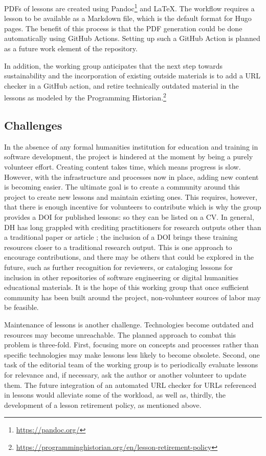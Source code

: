 \documentclass[final]{anthology-ch} %
\begin{document}
PDFs of lessons are created using Pandoc\footnote{\url{https://pandoc.org/}
} and LaTeX. The workflow requires a lesson to be available as a Markdown file, which is the default format for Hugo pages. The benefit of this process is that the PDF generation could be done automatically using GitHub Actions. Setting up such a GitHub Action is planned as a future work element of the repository.

In addition, the working group anticipates that the next step towards sustainability and the incorporation of existing outside materials is to add a URL checker in a GitHub action, and retire technically outdated material in the lessons as modeled by the Programming Historian.\footnote{\url{https://programminghistorian.org/en/lesson-retirement-policy}
}

\subsection{Challenges}

In the absence of any formal humanities institution for education and training in software development, the project is hindered at the moment by being a purely volunteer effort. Creating content takes time, which means progress is slow. However, with the infrastructure and processes now in place, adding new content is becoming easier. The ultimate goal is to create a community around this project to create new lessons and maintain existing ones. This requires, however, that there is enough incentive for volunteers to contribute which is why the group provides a DOI for published lessons: so they can be listed on a CV. In general, DH has long grappled with crediting practitioners for research outputs other than a traditional paper or article \cite{nowviskie2011}; the inclusion of a DOI brings these training resources closer to a traditional research output. This is one approach to encourage contributions, and there may be others that could be explored in the future, such as further recognition for reviewers, or cataloging lessons for inclusion in other repositories of software engineering or digital humanities educational materials. It is the hope of this working group that once sufficient community has been built around the project, non-volunteer sources of labor may be feasible.

Maintenance of lessons is another challenge. Technologies become outdated and resources may become unreachable. The planned approach to combat this problem is three-fold. First, focusing more on concepts and processes rather than specific technologies may make lessons less likely to become obsolete. Second, one task of the editorial team of the working group is to periodically evaluate lessons for relevance and, if necessary, ask the author or another volunteer to update them. The future integration of an automated URL checker for URLs referenced in lessons would alleviate some of the workload, as well as, thirdly, the development of a lesson retirement policy, as mentioned above.
\end{document}
